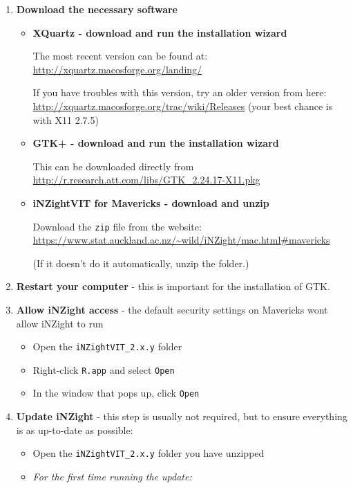 \documentclass[10pt,a4paper,twoside]{article}
\begin{document}
\begin{enumerate}
\item \textbf{Download the necessary software}
  \begin{itemize}
  \item \textbf{XQuartz - download and run the installation wizard}

    The most recent version can be found at:\\ \url{http://xquartz.macosforge.org/landing/}

    If you have troubles with this version, try an older version from here:\\
    \url{http://xquartz.macosforge.org/trac/wiki/Releases} (your best chance is with X11
    2.7.5)

  \item \textbf{GTK+ - download and run the installation wizard}

    This can be downloaded directly from\\ \url{http://r.research.att.com/libs/GTK_2.24.17-X11.pkg}

  \item \textbf{iNZightVIT for Mavericks - download and unzip}
    
    Download the \verb+zip+ file from the website:\\
    \url{https://www.stat.auckland.ac.nz/~wild/iNZight/mac.html#mavericks}

    (If it doesn't do it automatically, unzip the folder.)
  \end{itemize}

\item \textbf{Restart your computer} - this is important for the installation of GTK.

\item \textbf{Allow iNZight access} - the default security settings on Mavericks wont
  allow iNZight to run

  \begin{itemize}
  \item Open the \verb+iNZightVIT_2.x.y+ folder
  \item Right-click \verb+R.app+ and select \verb+Open+
  \item In the window that pops up, click \verb+Open+
  \end{itemize}

\item \textbf{Update iNZight} - this step is usually not required, but to ensure
  everything is as up-to-date as possible:
  \begin{itemize}
  \item Open the \verb+iNZightVIT_2.x.y+ folder you have unzipped
  \item \emph{For the first time running the update:}


\end{itemize}
\end{enumerate}
\end{document}
